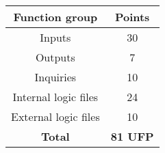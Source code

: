 \begin{center}
\begin{tabular}{|c|c|}
\hline
\multicolumn{1}{|c|}{\textbf{Function group}} & \multicolumn{1}{c|}{\textbf{Points}}\\
\hline
Inputs					&30\\
Outputs					&7\\
Inquiries				&10\\
Internal logic files	&24\\
External logic files	&10\\
\hline
\multicolumn{1}{|c|}{\textbf{Total}} & \multicolumn{1}{c|}{\textbf{81 UFP}}\\
\hline
\end{tabular}
\end{center}

